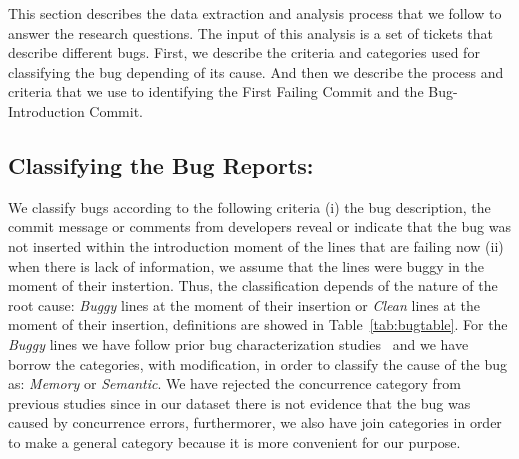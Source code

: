 \documentclass[a4paper, 12pt]{book}
\begin{document}
This section describes the data extraction and analysis process that we follow to answer the research questions. The input of this analysis is a set of tickets that describe different bugs. First, we describe the criteria and categories used for classifying the bug depending of its cause. And then we describe the process and criteria that we use to identifying the First Failing Commit and the Bug-Introduction Commit.

\subsection{Classifying the Bug Reports:}
We classify bugs according to the following criteria (i) the bug description, the commit message or comments from developers reveal or indicate  that the bug was not inserted within the introduction moment of the lines that are failing now (ii) when there is lack of information, we assume that the lines were buggy in the moment of their instertion. Thus, the classification depends of the nature of the root cause: \emph{Buggy} lines at the moment of their insertion or \emph{Clean} lines at the moment of their insertion, definitions are showed in Table~\ref{tab:bugtable}. For the \emph{Buggy} lines we have follow prior bug characterization studies~\cite{chen2014empirical,tan2014bug} and we have borrow the categories, with modification, in order to classify the cause of the bug as: \emph{Memory} or \emph{Semantic}. We have rejected the concurrence category from previous studies since in our dataset there is not evidence that the bug was caused by concurrence errors, furthermorer, we also have join categories in order to make a general category because it is more convenient for our purpose.
\end{document}
